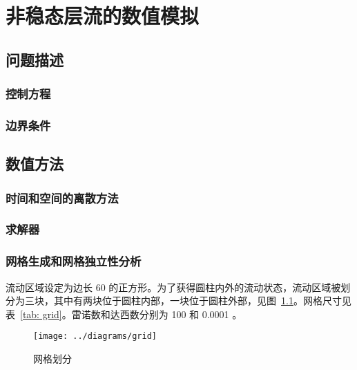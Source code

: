 \chapter{非稳态层流的数值模拟}

\section{问题描述}

\subsection{控制方程} %

\subsection{边界条件} %

\section{数值方法}

\subsection{时间和空间的离散方法}

\subsection{求解器} %

\subsection{网格生成和网格独立性分析}

流动区域设定为边长 60 的正方形。为了获得圆柱内外的流动状态，流动区域被划分为三块，其中有两块位于圆柱内部，一块位于圆柱外部，见图~\ref{fig: grid}。网格尺寸见表~\ref{tab: grid}。雷诺数和达西数分别为 100 和 0.0001 。
\begin{figure}
	\centering
	\texttt{[image: ../diagrams/grid]}
	\caption{网格划分}\label{fig: grid}
\end{figure}

